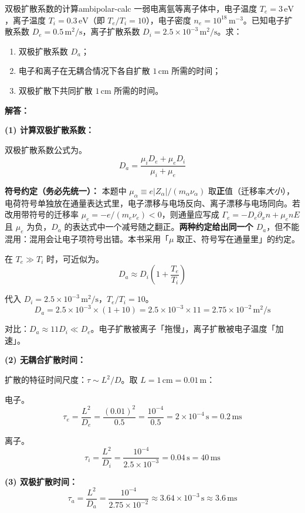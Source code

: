\begin{example}{双极扩散系数的计算}{ambipolar-calc}
一弱电离氩等离子体中，电子温度 $T_e = 3\,\mathrm{eV}$，离子温度 $T_i = 0.3\,\mathrm{eV}$（即 $T_e/T_i = 10$），电子密度 $n_e = 10^{18}\,\mathrm{m}^{-3}$。已知电子扩散系数 $D_e = 0.5\,\mathrm{m}^2/\mathrm{s}$，离子扩散系数 $D_i = 2.5\times 10^{-3}\,\mathrm{m}^2/\mathrm{s}$。求：
\begin{enumerate}[label=(\arabic*)]
\item 双极扩散系数 $D_a$；
\item 电子和离子在无耦合情况下各自扩散 $1\,\mathrm{cm}$ 所需的时间；
\item 双极扩散下共同扩散 $1\,\mathrm{cm}$ 所需的时间。
\end{enumerate}
\tcblower
\textbf{解答：}

\textbf{(1) 计算双极扩散系数：}

双极扩散系数公式为。
\[
D_a = \frac{\mu_i D_e + \mu_e D_i}{\mu_i + \mu_e}
\]

\textbf{符号约定（务必先统一）：} 本题中 $\mu_\alpha\equiv e|Z_\alpha|/(m_\alpha\nu_\alpha)$ 取\textbf{正}值（迁移率\emph{大小}），电荷符号单独放在通量表达式里，电子漂移与电场反向、离子漂移与电场同向。若改用带符号的迁移率 $\mu_e=-e/(m_e\nu_e)<0$，则通量应写成 $\Gamma_e=-D_e\partial_xn+\mu_enE$ 且 $\mu_e$ 为负，$D_a$ 的表达式中一个减号随之翻正。\textbf{两种约定给出同一个 $D_a$}，但不能混用：混用会让电子项符号出错。本书采用「$\mu$ 取正、符号写在通量里」的约定。

在 $T_e \gg T_i$ 时，可近似为。
\[
D_a \approx D_i\left(1 + \frac{T_e}{T_i}\right)
\]

代入 $D_i = 2.5\times 10^{-3}\,\mathrm{m}^2/\mathrm{s}$，$T_e/T_i = 10$。
\[
D_a = 2.5\times 10^{-3}\times (1 + 10) = 2.5\times 10^{-3}\times 11 = 2.75\times 10^{-2}\,\mathrm{m}^2/\mathrm{s}
\]

对比：$D_a \approx 11 D_i \ll D_e$。电子扩散被离子「拖慢」，离子扩散被电子温度「加速」。

\textbf{(2) 无耦合扩散时间：}

扩散的特征时间尺度：$\tau \sim L^2/D$。取 $L = 1\,\mathrm{cm} = 0.01\,\mathrm{m}$：

电子。
\[
\tau_e = \frac{L^2}{D_e} = \frac{(0.01)^2}{0.5} = \frac{10^{-4}}{0.5} = 2\times 10^{-4}\,\mathrm{s} = 0.2\,\mathrm{ms}
\]

离子。
\[
\tau_i = \frac{L^2}{D_i} = \frac{10^{-4}}{2.5\times 10^{-3}} = 0.04\,\mathrm{s} = 40\,\mathrm{ms}
\]

\textbf{(3) 双极扩散时间：}
\[
\tau_a = \frac{L^2}{D_a} = \frac{10^{-4}}{2.75\times 10^{-2}} \approx 3.64\times 10^{-3}\,\mathrm{s} \approx 3.6\,\mathrm{ms}
\]


\end{example}
